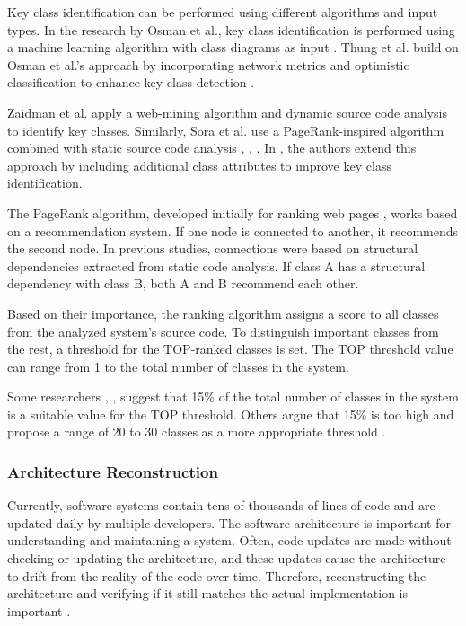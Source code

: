 Key class identification can be performed using different algorithms and input types. In the research by Osman et al., key class identification is performed using a machine learning algorithm with class diagrams as input \cite{6676885}. Thung et al. build on Osman et al.’s approach by incorporating network metrics and optimistic classification to enhance key class detection \cite{rocclasification}. 

Zaidman et al. \cite{ZaidmanJurnal} apply a web-mining algorithm and dynamic source code analysis to identify key classes. Similarly, Sora et al. use a PageRank-inspired algorithm combined with static source code analysis \cite{PagerankENASE}, \cite{enase15}, \cite{PagerankSACI}. In \cite{Finding-key-classes}, the authors extend this approach by including additional class attributes to improve key class identification. 

The PageRank algorithm, developed initially for ranking web pages \cite{ilprints422}, works based on a recommendation system. If one node is connected to another, it recommends the second node. In previous studies, connections were based on structural dependencies extracted from static code analysis. If class A has a structural dependency with class B, both A and B recommend each other.

Based on their importance, the ranking algorithm assigns a score to all classes from the analyzed system's source code. To distinguish important classes from the rest, a threshold for the TOP-ranked classes is set. The TOP threshold value can range from 1 to the total number of classes in the system. 

Some researchers \cite{ZaidmanJurnal}, \cite{Ding2016AnIA}, \cite{PAN2018188} suggest that 15\% of the total number of classes in the system is a suitable value for the TOP threshold. Others \cite{Finding-key-classes} argue that 15\% is too high and propose a range of 20 to 30 classes as a more appropriate threshold \cite{b4}.




\subsubsection{Architecture Reconstruction}
\label{clustering-related-work}

\hspace{4em}Currently, software systems contain tens of thousands of lines of code and are updated daily by multiple developers. The software architecture is important for understanding and maintaining a system. Often, code updates are made without checking or updating the architecture, and these updates cause the architecture to drift from the reality of the code over time. Therefore, reconstructing the architecture and verifying if it still matches the actual implementation is important \cite{RecoverySartipi, model-bennett, Kalliamvakou2016}.

